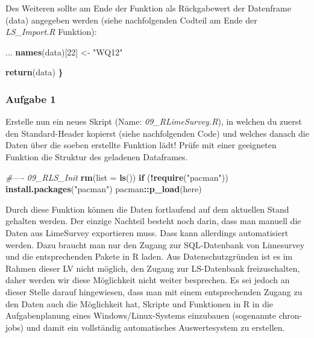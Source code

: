\documentclass[]{article}
\newenvironment{Shaded}{\begin{snugshade}}{\end{snugshade}}
\newcommand{\KeywordTok}[1]{\textcolor[rgb]{0.13,0.29,0.53}{\textbf{#1}}}
\newcommand{\DataTypeTok}[1]{\textcolor[rgb]{0.13,0.29,0.53}{#1}}
\newcommand{\DecValTok}[1]{\textcolor[rgb]{0.00,0.00,0.81}{#1}}
\newcommand{\StringTok}[1]{\textcolor[rgb]{0.31,0.60,0.02}{#1}}
\newcommand{\CommentTok}[1]{\textcolor[rgb]{0.56,0.35,0.01}{\textit{#1}}}
\newcommand{\ControlFlowTok}[1]{\textcolor[rgb]{0.13,0.29,0.53}{\textbf{#1}}}
\newcommand{\OperatorTok}[1]{\textcolor[rgb]{0.81,0.36,0.00}{\textbf{#1}}}
\newcommand{\ErrorTok}[1]{\textcolor[rgb]{0.64,0.00,0.00}{\textbf{#1}}}
\newcommand{\NormalTok}[1]{#1}
\begin{document}
Des Weiteren sollte am Ende der Funktion als Rückgabewert der Datenframe
(data) angegeben werden (siehe nachfolgenden Codteil am Ende der
\emph{LS\_Import.R} Funktion):

\begin{Shaded}
\begin{Highlighting}[]
\NormalTok{  ...}
  \KeywordTok{names}\NormalTok{(data)[}\DecValTok{22}\NormalTok{] <-}\StringTok{ "WQ12"}
  
  \KeywordTok{return}\NormalTok{(data)}
\ErrorTok{\}}
\end{Highlighting}
\end{Shaded}

\subsubsection*{Aufgabe 1}\label{aufgabe-1-1}

Erstelle nun ein neues Skript (Name: \emph{09\_RLimeSurvey.R}), in
welchen du zuerst den Standard-Header kopierst (siehe nachfolgenden
Code) und welches danach die Daten über die soeben erstellte Funktion
lädt! Prüfe mit einer geeigneten Funktion die Struktur des geladenen
Dataframes.

\begin{Shaded}
\begin{Highlighting}[]
\CommentTok{#---- 09_RLS_Init}
  \KeywordTok{rm}\NormalTok{(}\DataTypeTok{list =} \KeywordTok{ls}\NormalTok{())}
  \ControlFlowTok{if}\NormalTok{ (}\OperatorTok{!}\KeywordTok{require}\NormalTok{(}\StringTok{"pacman"}\NormalTok{)) }\KeywordTok{install.packages}\NormalTok{(}\StringTok{"pacman"}\NormalTok{)}
\NormalTok{  pacman}\OperatorTok{::}\KeywordTok{p_load}\NormalTok{(here)}
\end{Highlighting}
\end{Shaded}

Durch diese Funktion können die Daten fortlaufend auf dem aktuellen
Stand gehalten werden. Der einzige Nachteil besteht noch darin, dass man
manuell die Daten aus LimeSurvey exportieren muss. Dass kann allerdings
automatisiert werden. Dazu braucht man nur den Zugang zur SQL-Datenbank
von Limesurvey und die entsprechenden Pakete in R laden. Aus
Datenschutzgründen ist es im Rahmen dieser LV nicht möglich, den Zugang
zur LS-Datenbank freizuschalten, daher werden wir diese Möglichkeit
nicht weiter besprechen. Es sei jedoch an dieser Stelle darauf
hingewiesen, dass man mit einem entsprechenden Zugang zu den Daten auch
die Möglichkeit hat, Skripte und Funktionen in R in die Aufgabenplanung
eines Windows/Linux-Systems einzubauen (sogenannte chron-jobs) und damit
ein vollständig automatisches Auswertesystem zu erstellen.
\end{document}
